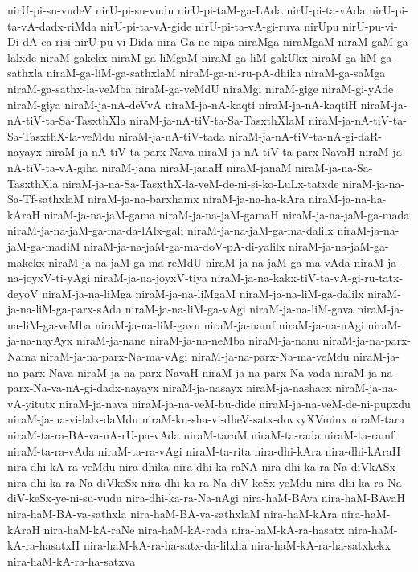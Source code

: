 {nirU-pi-su-vudeV
nirU-pi-su-vudu
nirU-pi-taM-ga-LAda
nirU-pi-ta-vAda
nirU-pi-ta-vA-dadx-riMda
nirU-pi-ta-vA-gide
nirU-pi-ta-vA-gi-ruva
nirUpu
nirU-pu-vi-Di-dA-ca-risi
nirU-pu-vi-Dida
nira-Ga-ne-nipa
niraMga
niraMgaM
niraM-gaM-ga-lalxde
niraM-gakekx
niraM-ga-liMgaM
niraM-ga-liM-gakUkx
niraM-ga-liM-ga-sathxla
niraM-ga-liM-ga-sathxlaM
niraM-ga-ni-ru-pA-dhika
niraM-ga-saMga
niraM-ga-sathx-la-veMba
niraM-ga-veMdU
niraMgi
niraM-gige
niraM-gi-yAde
niraM-giya
niraM-ja-nA-deVvA
niraM-ja-nA-kaqti
niraM-ja-nA-kaqtiH
niraM-ja-nA-tiV-ta-Sa-TasxthXla
niraM-ja-nA-tiV-ta-Sa-TasxthXlaM
niraM-ja-nA-tiV-ta-Sa-TasxthX-la-veMdu
niraM-ja-nA-tiV-tada
niraM-ja-nA-tiV-ta-nA-gi-daR-nayayx
niraM-ja-nA-tiV-ta-parx-Nava
niraM-ja-nA-tiV-ta-parx-NavaH
niraM-ja-nA-tiV-ta-vA-giha
niraM-jana
niraM-janaH
niraM-janaM
niraM-ja-na-Sa-TasxthXla
niraM-ja-na-Sa-TasxthX-la-veM-de-ni-si-ko-LuLx-tatxde
niraM-ja-na-Sa-Tf-sathxlaM
niraM-ja-na-barxhamx
niraM-ja-na-ha-kAra
niraM-ja-na-ha-kAraH
niraM-ja-na-jaM-gama
niraM-ja-na-jaM-gamaH
niraM-ja-na-jaM-ga-mada
niraM-ja-na-jaM-ga-ma-da-lAlx-gali
niraM-ja-na-jaM-ga-ma-dalilx
niraM-ja-na-jaM-ga-madiM
niraM-ja-na-jaM-ga-ma-doV-pA-di-yalilx
niraM-ja-na-jaM-ga-makekx
niraM-ja-na-jaM-ga-ma-reMdU
niraM-ja-na-jaM-ga-ma-vAda
niraM-ja-na-joyxV-ti-yAgi
niraM-ja-na-joyxV-tiya
niraM-ja-na-kakx-tiV-ta-vA-gi-ru-tatx-deyoV
niraM-ja-na-liMga
niraM-ja-na-liMgaM
niraM-ja-na-liM-ga-dalilx
niraM-ja-na-liM-ga-parx-sAda
niraM-ja-na-liM-ga-vAgi
niraM-ja-na-liM-gava
niraM-ja-na-liM-ga-veMba
niraM-ja-na-liM-gavu
niraM-ja-namf
niraM-ja-na-nAgi
niraM-ja-na-nayAyx
niraM-ja-nane
niraM-ja-na-neMba
niraM-ja-nanu
niraM-ja-na-parx-Nama
niraM-ja-na-parx-Na-ma-vAgi
niraM-ja-na-parx-Na-ma-veMdu
niraM-ja-na-parx-Nava
niraM-ja-na-parx-NavaH
niraM-ja-na-parx-Na-vada
niraM-ja-na-parx-Na-va-nA-gi-dadx-nayayx
niraM-ja-nasayx
niraM-ja-nashacx
niraM-ja-na-vA-yitutx
niraM-ja-nava
niraM-ja-na-veM-bu-dide
niraM-ja-na-veM-de-ni-pupxdu
niraM-ja-na-vi-lalx-daMdu
niraM-ku-sha-vi-dheV-satx-dovxyXVminx
niraM-tara
niraM-ta-ra-BA-va-nA-rU-pa-vAda
niraM-taraM
niraM-ta-rada
niraM-ta-ramf
niraM-ta-ra-vAda
niraM-ta-ra-vAgi
niraM-ta-rita
nira-dhi-kAra
nira-dhi-kAraH
nira-dhi-kA-ra-veMdu
nira-dhika
nira-dhi-ka-raNA
nira-dhi-ka-ra-Na-diVkASx
nira-dhi-ka-ra-Na-diVkeSx
nira-dhi-ka-ra-Na-diV-keSx-yeMdu
nira-dhi-ka-ra-Na-diV-keSx-ye-ni-su-vudu
nira-dhi-ka-ra-Na-nAgi
nira-haM-BAva
nira-haM-BAvaH
nira-haM-BA-va-sathxla
nira-haM-BA-va-sathxlaM
nira-haM-kAra
nira-haM-kAraH
nira-haM-kA-raNe
nira-haM-kA-rada
nira-haM-kA-ra-hasatx
nira-haM-kA-ra-hasatxH
nira-haM-kA-ra-ha-satx-da-lilxha
nira-haM-kA-ra-ha-satxkekx
nira-haM-kA-ra-ha-satxva
}

